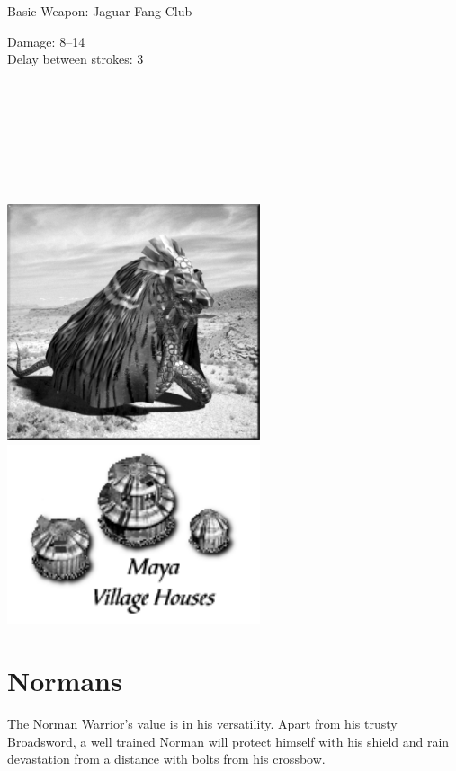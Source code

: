 Basic Weapon: Jaguar Fang Club
\begin{adjustwidth}{1cm}{}
	Damage: 8–14 \\
	Delay between strokes: 3 \\ \\ \\ \\ \\ \\ \\ \\ 
\end{adjustwidth}

\begin{center}
	\includegraphics[width=74.25mm]{Akukulcan}\includegraphics[width=74.25mm]{Imayanhouse}
\end{center}

\clearpage

\section{Normans}

The Norman Warrior’s value is in his versatility. Apart from his trusty Broadsword, a well trained Norman will protect himself with his shield and rain devastation from a distance with bolts from his crossbow.

